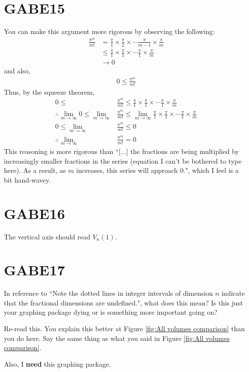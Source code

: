 \section{GABE15}
You can make this argument more rigorous by observing the following:
\begin{align*}
    \frac{\pi^{m}}{m!} &= \frac{\pi}{1} \times \frac{\pi}{2} \times \cdots \frac{\pi}{m-1} \times \frac{\pi}{m} \\
    &\leq \frac{\pi}{1} \times \frac{\pi}{1} \times \cdots \frac{\pi}{1} \times \frac{\pi}{m} \\ %
    &\to 0
\end{align*}
and also,
\begin{align*}
    0 \leq \frac{\pi^{m}}{m!}
\end{align*}
Thus, by the squeeze theorem,
\begin{align*}
    0 \leq &\frac{\pi^{m}}{m!} \leq \frac{\pi}{1} \times \frac{\pi}{1} \times \cdots \frac{\pi}{1} \times \frac{\pi}{m} \\
    \therefore \lim_{m\to\infty} 0
        \leq \lim_{m\to\infty} &\frac{\pi^m}{m!}
        \leq \lim_{m\to\infty} \frac{\pi}{1} \times \frac{\pi}{1} \times \cdots \frac{\pi}{1} \times \frac{\pi}{m} \\
    0\leq \lim_{m\to\infty} &\frac{\pi^m}{m!} \leq 0 \\
    \therefore \lim_{m\to\infty} &\frac{\pi^m}{m!} = 0
\end{align*}
This reasoning is more rigorous than ``[...] the fractions are being multiplied by increasingly smaller fractions in the series (equation I can't be bothered to type here). As a result, as $m$ increases, this series will approach $0$.", which I feel is a bit hand-wavey.

\section{GABE16}
The vertical axis should read $V_{n} (1)$.

\section{GABE17}
In reference to ``Note the dotted lines in integer intervals of dimension $n$ indicate that the fractional dimensions are undefined.", what does this mean? Is this just your graphing package dying or is something more important going on?
\par Re-read this. You explain this better at Figure \ref{fig:All volumes comparison} than you do here. Say the same thing as what you said in Figure \ref{fig:All volumes comparison}.
\par Also, I \textbf{need} this graphing package.


